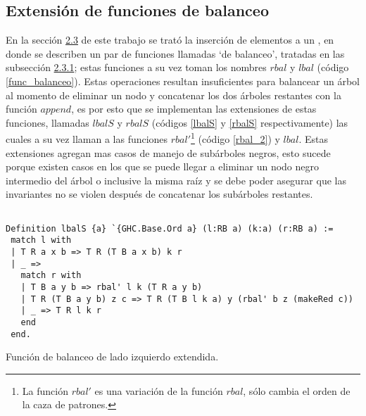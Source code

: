 \subsection{Extensi\'on de funciones de balanceo}

En la secci\'on \hyperref[sec_ins]{2.3} de este trabajo se trat\'o la inserci\'on de elementos a un {\arn}, en donde se
describen un par de funciones llamadas `de balanceo', tratadas en las subsecci\'on \hyperref[subsec_bal]{2.3.1}; estas 
funciones a su vez toman los nombres \hyperref[func_balanceo]{$rbal$} y 
\hyperref[func_balanceo]{$lbal$} (c\'odigo \ref{func_balanceo}). Estas operaciones resultan 
insuficientes para balancear un \'arbol al momento de eliminar un nodo y concatenar los dos 
\'arboles restantes con la función \hyperref[func_app]{$append$}, es por esto que se implementan las
extensiones de estas funciones, llamadas \hyperref[lbalS]{$lbalS$} y \hyperref[lbalS]{$rbalS$} 
(c\'odigos \ref{lbalS} y \ref{rbalS} respectivamente) las cuales a su vez llaman a las funciones 
\hyperref[rbal_2]{$rbal'$}\footnote{La funci\'on \hyperref[rbal_2]{$rbal'$} es una variación de la 
función \hyperref[func_balanceo]{$rbal$}, s\'olo cambia el orden de la caza de patrones.} (c\'odigo
\ref{rbal_2}) y \hyperref[func_balanceo]{$lbal$}. Estas extensiones agregan mas casos de manejo de 
subárboles negros, esto sucede porque existen casos en los que se puede llegar a eliminar un nodo 
negro intermedio del \'arbol o inclusive la misma ra\'iz y se debe poder asegurar que las invariantes 
no se violen después de concatenar los subárboles restantes.

\begin{listing}[!ht]
\centering
\captionsetup{justification=centering}
\begin{verbatim}

Definition lbalS {a} `{GHC.Base.Ord a} (l:RB a) (k:a) (r:RB a) :=
 match l with
 | T R a x b => T R (T B a x b) k r
 | _ =>
   match r with
   | T B a y b => rbal' l k (T R a y b)
   | T R (T B a y b) z c => T R (T B l k a) y (rbal' b z (makeRed c))
   | _ => T R l k r
   end
 end.

\end{verbatim}
\caption{Funci\'on de balanceo de lado izquierdo extendida.}
\label{lbalS}
\end{listing}

